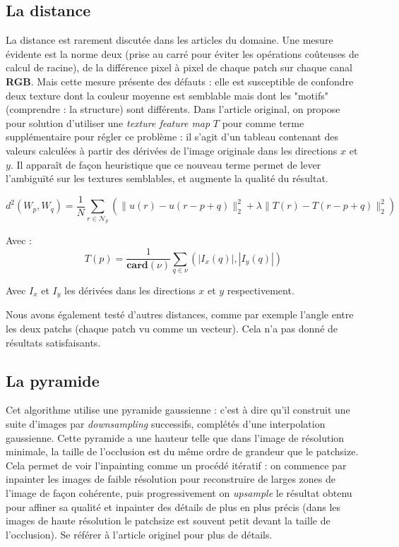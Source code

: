 \documentclass[a4paper, 10pt]{article}
\begin{document}
\subsection{La distance}

La distance est rarement discutée dans les articles du domaine. Une mesure évidente est la norme deux (prise au carré pour éviter les opérations coûteuses de calcul de racine), de la différence pixel à pixel de chaque patch sur chaque canal \textbf{RGB}. Mais cette mesure présente des défauts : elle est susceptible de confondre deux texture dont la couleur moyenne est semblable mais dont les "motifs" (comprendre : la structure) sont différents. Dans l'article original, on propose pour solution d’utiliser une \textit{texture feature map} $T$ pour comme terme supplémentaire pour régler ce problème : il s'agit d'un tableau contenant des valeurs calculées à partir des dérivées de l'image originale dans les directions $x$ et $y$. Il apparaît de façon heuristique que ce nouveau terme permet de lever l'ambiguïté sur les textures semblables, et augmente la qualité du résultat.  
  
$$d^2(W_p,W_q)=\frac{1}{N}\sum_{r\in\mathcal{N}_p}(\|u(r)-u(r-p+q)\|_2^2+\lambda\|T(r)-T(r-p+q)\|_2^2)$$

Avec : $$T(p)=\frac{1}{\textbf{card}(\nu)}\sum_{q\in\nu}(|I_x(q)|,|I_y(q)|)$$

Avec $I_x$ et $I_y$ les dérivées dans les directions $x$ et $y$ respectivement.  
  
Nous avons également testé d'autres distances, comme par exemple l'angle entre les deux patchs (chaque patch vu comme un vecteur). Cela n'a pas donné de résultats satisfaisants.

\subsection{La pyramide}

Cet algorithme utilise une pyramide gaussienne : c'est à dire qu'il construit une suite d'images par \textit{downsampling} successifs, complétés d'une interpolation gaussienne. Cette pyramide a une hauteur telle que dans l'image de résolution minimale, la taille de l'occlusion est du même ordre de grandeur que le patchsize. Cela permet de voir l'inpainting comme un procédé itératif : on commence par inpainter les images de faible résolution pour reconstruire de larges zones de l'image de façon cohérente, puis progressivement on \textit{upsample} le résultat obtenu pour affiner sa qualité et inpainter des détails de plus en plus précis (dans les images de haute résolution le patchsize est souvent petit devant la taille de l'occlusion). Se référer à l'article originel pour plus de détails.
\end{document}
